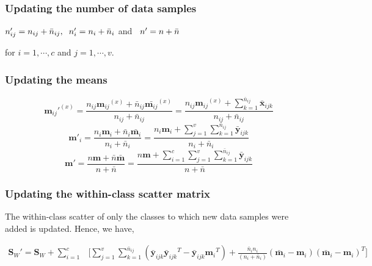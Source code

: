 \subsubsection{Updating the number of data samples}
\label{ssubs:MvIDA_ChkEC_n}
\begin{center}
$n'_{ij} = n_{ij} + \bar{n}_{ij}, \hspace{0.2cm} n'_i = n_i + \bar{n}_i$ and $\hspace{0.2cm} n' = n + \bar{n}$
\end{center}
for $i=1,\cdots,c$ and $j=1,\cdots,v$.



\subsubsection{Updating the means}
\label{ssubs:MvIDA_ChkEC_mu}
\begin{equation}
\label{eqn:3muij}
{\textbf{m}_{ij}'}^{(x)} = \frac{ n_{ij} {\textbf{m}_{ij}}^{(x)} + \bar{n}_{ij} \bar{\textbf{m}_{ij}}^{(x)}} {n_{ij} + \bar{n}_{ij}} = \frac{n_{ij} {\textbf{m}_{ij}}^{(x)} + \sum_{k=1}^{\bar{n}_{ij}} \bar{\textbf{x}}_{ijk}}{n_{ij} + \bar{n}_{ij}}
\end{equation}
\begin{equation}
\label{eqn:3mui}
\textbf{m}'_{i} = \frac{n_i \textbf{m}_{i} + \bar{n}_i \bar{\textbf{m}_{i}}}{n_i + \bar{n}_i} = \frac{n_i \textbf{m}_{i} + \sum_{j=1}^{v} \sum_{k=1}^{\bar{n}_{ij}} \bar{\textbf{y}}_{ijk}}{n_i + \bar{n}_i}
\end{equation}
\begin{equation}
\label{eqn:3mu}
\textbf{m}' = \frac{n \textbf{m} + \bar{n} \bar{\textbf{m}}}{n+\bar{n}} = \frac{n \textbf{m} + \sum_{i=1}^{c} \sum_{j=1}^{v} \sum_{k=1}^{\bar{n}_{ij}} \bar{\textbf{y}}_{ijk}}{n+\bar{n}}
\end{equation}



\subsubsection{Updating the within-class scatter matrix}
\label{ssubs:MvIDA_ChkEC_Sw}
The within-class scatter of only the classes to which new data samples were added is updated. Hence, we have,

\begin{equation}
\label{eqn:3Sw}
\begin{split}
\textbf{S}_W' = \textbf{S}_W + \sum_{i=1}^{c} & \Bigg[ \sum_{j=1}^{v} \sum_{k=1}^{\bar{n}_{ij}} \left ( \bar{\textbf{y}}_{ijk} {\bar{\textbf{y}}_{ijk}}^T - \bar{\textbf{y}}_{ijk} {\textbf{m}_i}^T \right ) + \frac{\bar{n}_{i} n_{i}}{(n_{i}+\bar{n}_{i})} \left ( \bar{\textbf{m}}_i - \textbf{m}_{i} \right ) \left ( \bar{\textbf{m}}_i - \textbf{m}_{i} \right )^T  \Bigg]
\end{split}
\end{equation}

